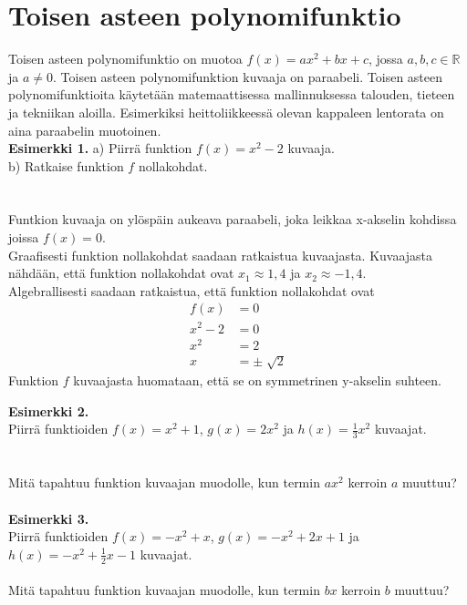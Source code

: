 \chapter{Toisen asteen polynomifunktio}
Toisen asteen polynomifunktio on muotoa $f(x)=ax^2+bx+c$, jossa $a,b,c \in \mathbb{R}$ ja $a \neq 0$. Toisen asteen polynomifunktion kuvaaja on paraabeli. Toisen asteen polynomifunktioita käytetään matemaattisessa mallinnuksessa talouden, tieteen ja tekniikan aloilla. Esimerkiksi heittoliikkeessä olevan kappaleen lentorata on aina paraabelin muotoinen. \\
\textbf{Esimerkki 1.}
a) Piirrä funktion $f(x)=x^2-2$ kuvaaja. \\
b) Ratkaise funktion $f$ nollakohdat. \\ \\
\missingfigure \\
Funtkion kuvaaja on ylöspäin aukeava paraabeli, joka leikkaa x-akselin kohdissa joissa $f(x)=0$. \\
Graafisesti funktion nollakohdat saadaan ratkaistua kuvaajasta. Kuvaajasta nähdään, että funktion nollakohdat ovat $x_1 \approx 1,4$ ja $x_2 \approx -1,4$. \\
Algebrallisesti saadaan ratkaistua, että funktion nollakohdat ovat
\begin{align*}
f(x)&=0 \\
x^2-2&=0 \\
x^2&=2 \\
x&= \pm \sqrt[]{2}
\end{align*}
Funktion $f$ kuvaajasta huomataan, että se on symmetrinen y-akselin suhteen.

\textbf{Esimerkki 2.} \\
Piirrä funktioiden $f(x)=x^2+1$, $g(x)=2x^2$ ja $h(x)=\frac{1}{3}x^2$ kuvaajat. \\ \\
\missingfigure \\
Mitä tapahtuu funktion kuvaajan muodolle, kun termin $ax^2$ kerroin $a$ muuttuu? \\ \\

\textbf{Esimerkki 3.} \\
Piirrä funktioiden $f(x)=-x^2+x$, $g(x)=-x^2+2x+1$ ja $h(x)=-x^2+\frac{1}{2}x-1$ kuvaajat. \\
\missingfigure \\
Mitä tapahtuu funktion kuvaajan muodolle, kun termin $bx$ kerroin $b$ muuttuu? \\ \\

